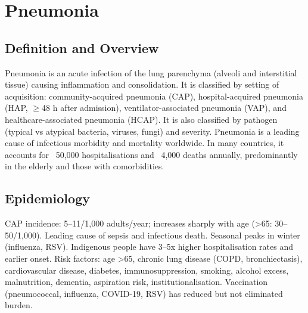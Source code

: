\chapter{Pneumonia}

\section*{Definition and Overview}
Pneumonia is an acute infection of the lung parenchyma (alveoli and interstitial tissue) causing inflammation and consolidation. It is classified by setting of acquisition: community-acquired pneumonia (CAP), hospital-acquired pneumonia (HAP, $\ge$48 h after admission), ventilator-associated pneumonia (VAP), and healthcare-associated pneumonia (HCAP). It is also classified by pathogen (typical vs atypical bacteria, viruses, fungi) and severity. Pneumonia is a leading cause of infectious morbidity and mortality worldwide. In many countries, it accounts for ~50,000 hospitalisations and ~4,000 deaths annually, predominantly in the elderly and those with comorbidities.

\section*{Epidemiology}
CAP incidence: 5--11/1,000 adults/year; increases sharply with age (>65: 30--50/1,000). Leading cause of sepsis and infectious death. Seasonal peaks in winter (influenza, RSV). Indigenous people have 3--5x higher hospitalisation rates and earlier onset. Risk factors: age >65, chronic lung disease (COPD, bronchiectasis), cardiovascular disease, diabetes, immunosuppression, smoking, alcohol excess, malnutrition, dementia, aspiration risk, institutionalisation. Vaccination (pneumococcal, influenza, COVID-19, RSV) has reduced but not eliminated burden.

